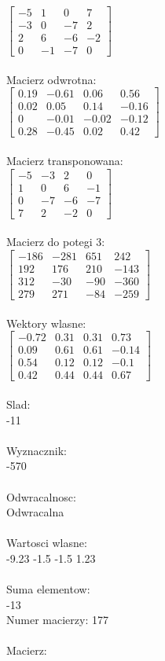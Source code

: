 \documentclass[a4paper,12pt]{article}
\begin{document}
$\begin{bmatrix} -5&1&0&7\\-3&0&-7&2\\2&6&-6&-2\\0&-1&-7&0 \end{bmatrix}$
\\
\\
Macierz odwrotna:\\

$\begin{bmatrix} 0.19&-0.61&0.06&0.56\\0.02&0.05&0.14&-0.16\\0&-0.01&-0.02&-0.12\\0.28&-0.45&0.02&0.42 \end{bmatrix}$
\\
\\
Macierz transponowana:\\

$\begin{bmatrix} -5&-3&2&0\\1&0&6&-1\\0&-7&-6&-7\\7&2&-2&0 \end{bmatrix}$
\\
\\
Macierz do potegi 3:\\

$\begin{bmatrix} -186&-281&651&242\\192&176&210&-143\\312&-30&-90&-360\\279&271&-84&-259 \end{bmatrix}$
\\
\\
Wektory wlasne:\\

$\begin{bmatrix} -0.72&0.31&0.31&0.73\\0.09&0.61&0.61&-0.14\\0.54&0.12&0.12&-0.1\\0.42&0.44&0.44&0.67 \end{bmatrix}$
\\
\\
Slad:\\
-11
\\
\\
Wyznacznik:\\
-570
\\
\\
Odwracalnosc:\\
Odwracalna
\\
\\
Wartosci wlasne:\\
-9.23 -1.5 -1.5 1.23
\\
\\
Suma elementow:\\
-13
\\
\newpage
Numer macierzy:
177
\\
\\
Macierz:\\
\end{document}
